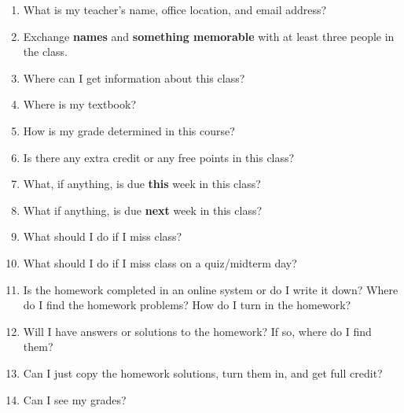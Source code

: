 \documentclass[12pt,fleqn]{article}
\begin{document}
\newcommand{\blank}[1]{\rule{#1}{0.75pt}}
\renewcommand{\d}{\displaystyle}
\begin{center}
  \large {}
\end{center}


\begin{enumerate}
\item What is my teacher's name, office location, and email address?

\vfill

\item Exchange \textbf{names} and \textbf{something memorable} with at least three people in the class. 
\vspace{2in}

\item Where can I get information about this class?\\


\vfill
\item Where is my textbook?\\

\vfill
\item How is my grade determined in this course? \\

\vfill
\item Is there any extra credit or any free points in this class?\\

\vfill
\item What, if anything, is due \textbf{this} week in this class? \\
\vfill
\item What if anything, is due \textbf{next} week in this class? \\
\vfill
\newpage
\item What should I do if I miss class?

\vfill

\item What should I do if I miss class on a quiz/midterm day?

\vfill

\item Is the homework completed in an online system or do I write it down? Where do I find the homework problems? How do I turn in the homework?
\vfill
\item Will I have answers or solutions to the homework? If so, where do I find them?\\
\vfill
\item Can I just copy the homework solutions, turn them in, and get full credit? \\
\vfill
\item Can I see my grades?\\
\vfill


\end{enumerate}
\end{document}
